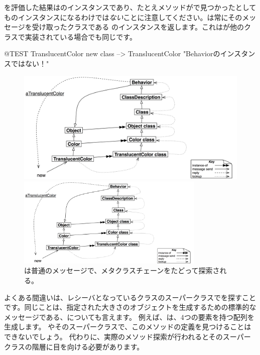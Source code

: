 \documentclass[a4paper,10pt,twoside]{book}
\begin{document}
を評価した結果はのインスタンスであり、たとえメソッドがで見つかったとしてものインスタンスになるわけでは\emph{ない}ことに注意してください。は常にそのメッセージを受け取ったクラスである \self のインスタンスを返します。これはが他のクラスで実装されている場合でも同じです。

\begin{code}{@TEST}
TranslucentColor new class --> TranslucentColor    "Behaviorのインスタンスではない！"
\end{code}

\begin{center}
\begin{figure}
\ifluluelse
	{\centerline{\includegraphics[width=\textwidth]{TranslucentSendingNew}}}
	{\centerline{\includegraphics[width=0.8\textwidth]{TranslucentSendingNew}}}
\caption{は普通のメッセージで、メタクラスチェーンをたどって探索される。}
\end{figure}
\end{center}

よくある間違いは、レシーバとなっているクラスのスーパークラスでを探すことです。同じことは、指定された大きさのオブジェクトを生成するための標準的なメッセージである、についても言えます。
例えば、は、4つの要素を持つ配列を生成します。
やそのスーパークラスで、このメソッドの定義を見つけることはできないでしょう。
代わりに、実際のメソッド探索が行われるとそのスーパークラスの階層に目を向ける必要があります。
\end{document}
